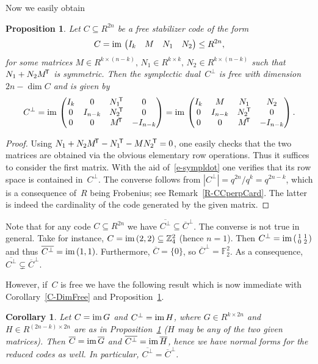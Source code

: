 \documentclass[11pt]{article}
\newtheorem{prop}[theo]{Proposition}
\newtheorem{cor}[theo]{Corollary}
\theoremstyle{definition}
\numberwithin{equation}{section}
\newcommand{\F}{{\mathbb F}}
\newcommand{\Z}{{\mathbb Z}}
\newcommand{\im}{\mbox{\rm im}\,}
\newcommand{\T}{\mbox{$\!^{\sf T}$}}
\newcommand{\ov}[1]{\mbox{$\overline{#1}$}}
\newcommand{\Smallfourmat}[4]{\mbox{$\left(\begin{smallmatrix}{#1}&{#2}\\{#3}&{#4}\end{smallmatrix}\right)$}}
\newcounter{rom}
\begin{document}
Now we easily obtain

\begin{prop}\label{P-FreeDual}
Let $C\subseteq R^{2n}$ be a free stabilizer code of the form
\[
  C=\im\begin{pmatrix}I_k&M&N_1&N_2\end{pmatrix}\leq R^{2n},
\]
for some matrices $M\in R^{k\times(n-k)},\, N_1\in R^{k\times k},\,N_2\in R^{k\times(n-k)}$ such that $N_1+N_2M\T$ is symmetric.
Then the symplectic dual~$C^\perp$ is free with dimension $2n-\dim C$ and is given by
\[
   C^\perp =\im\begin{pmatrix}I_k&0&N_1\T&0\\0&I_{n-k}&N_2\T&0\\0&0&M\T&-I_{n-k}\end{pmatrix}
      =\im\begin{pmatrix}I_k&M&N_1&N_2\\0&I_{n-k}&N_2\T&0\\0&0&M\T&-I_{n-k}\end{pmatrix}.
\]
\end{prop}

\begin{proof}
Using $N_1+N_2M\T-N_1\T-MN_2\T=0$, one easily checks that the two matrices are obtained via the obvious elementary row operations.
Thus it suffices to consider the first matrix.
With the aid of~\eqref{e-sympldot} one verifies that its row space is contained in~$C^\perp$. The converse follows from
$|C^\perp|=q^{2n}/q^k=q^{2n-k}$, which is a consequence of~$R$ being Frobenius; see Remark~\ref{R-CCperpCard}.
The latter is indeed the cardinality of the code generated by the given matrix.
\end{proof}

Note that for any code $C\subseteq R^{2n}$ we have $\ov{C^\perp}\subseteq\ov{C}^\perp$.
The converse is not true in general. Take for instance, $C=\im(2,2)\subseteq\Z_4^2$ (hence $n=1$).
Then $C^\perp=\im\Smallfourmat{1}{1}{0}{2}$ and thus $\ov{C^{\perp}}=\im(1,1)$.
Furthermore, $\ov{C}=\{0\}$, so $\ov{C}^{\perp}=\F_2^2$.
As a consequence, $\ov{C^{\perp}}\subsetneq\ov{C}^\perp$.

However, if~$C$ is free we have the following result which is now immediate with Corollary~\ref{C-DimFree} and Proposition~\ref{P-FreeDual}.

\begin{cor}\label{C-CfreeCbar}
Let $C=\im G$ and $C^{\perp}=\im H$, where $G\in R^{k\times 2n}$ and $H\in R^{(2n-k)\times 2n}$ are as in
Proposition~\ref{P-FreeDual} ($H$ may be any of the two given matrices). Then
$\ov{C}=\im \ov{G}$ and $\ov{C^\perp}=\im\ov{H}$, hence we have normal forms for the reduced codes as well.
In particular, $\ov{C^\perp}=\ov{C}^\perp$.
\end{cor}
\end{document}
